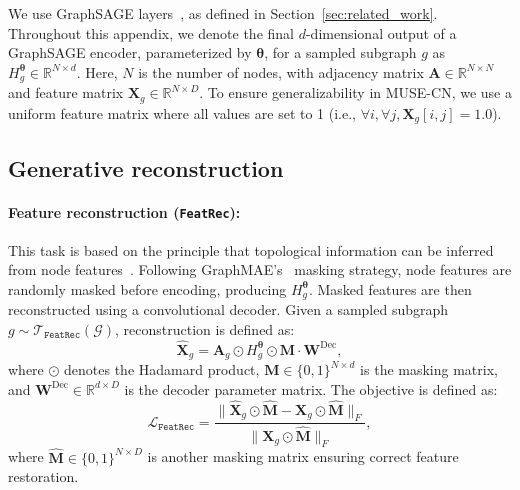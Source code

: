 \documentclass{article}
\newcommand{\featrec}{\texttt{FeatRec}\xspace}
\begin{document}
We use GraphSAGE layers~\cite{hamilton2017inductive}, as defined in Section~\ref{sec:related_work}. Throughout this appendix, we denote the final $d$-dimensional output of a GraphSAGE encoder, parameterized by $\boldsymbol{\theta}$, for a sampled subgraph $g$ as $H_g^{\boldsymbol{\theta}} \in \mathbb{R}^{N \times d}$. Here, $N$ is the number of nodes, with adjacency matrix $\mathbf{A} \in \mathbb{R}^{N \times N}$ and feature matrix $\mathbf{X}_g \in \mathbb{R}^{N \times D}$. To ensure generalizability in MUSE-CN, we use a uniform feature matrix where all values are set to 1 (i.e., $\forall i, \forall j, \mathbf{X}_g[i,j] = 1.0$).


\subsection{Generative reconstruction}
\paragraph{Feature reconstruction (\featrec):}
This task is based on the principle that topological information can be inferred from node features~\cite{zhang2021graph}. Following GraphMAE's~\citep{hou2022graphmae} masking strategy, node features are randomly masked before encoding, producing $H_g^{\boldsymbol{\theta}}$. Masked features are then reconstructed using a convolutional decoder. Given a sampled subgraph $g \sim \mathcal{T}_{\featrec}(\mathcal{G})$, reconstruction is defined as:
\begin{equation}
\hat{\mathbf{X}}_g = \mathbf{A}_g \odot H_g^{\boldsymbol{\theta}} \odot \mathbf{M} \cdot \mathbf{W}^{\text{Dec}},
\end{equation}
where $\odot$ denotes the Hadamard product, $\mathbf{M} \in \{0,1\}^{N \times d}$ is the masking matrix, and $\mathbf{W}^{\text{Dec}} \in \mathbb{R}^{d \times D}$ is the decoder parameter matrix. The objective is defined as:
\begin{equation}
\mathcal{L}_{\featrec} = \frac{\lVert \hat{\mathbf{X}}_g \odot \hat{\mathbf{M}} - \mathbf{X}_g\odot \hat{\mathbf{M}} \rVert_F}{\lVert \mathbf{X}_g \odot \hat{\mathbf{M}} \rVert_F},
\end{equation}
where $\hat{\mathbf{M}} \in \{0, 1\}^{N \times D}$ is another masking matrix ensuring correct feature restoration.
\end{document}
